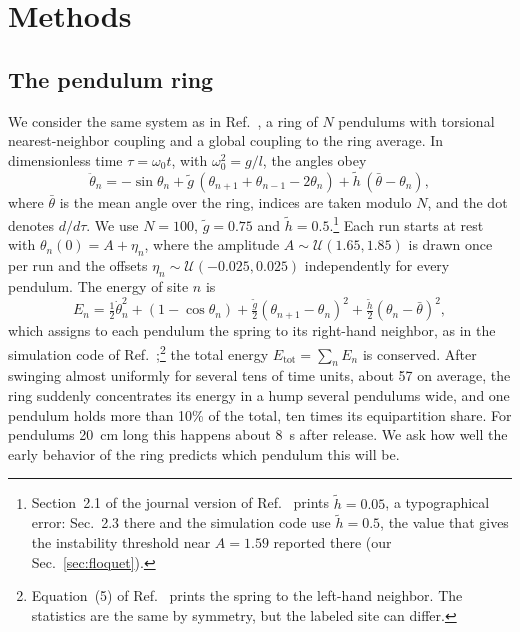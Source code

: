 \documentclass[11pt]{article}
\newcommand{\gt}{\tilde g}
\newcommand{\htl}{\tilde h}
\newcommand{\Etot}{E_{\mathrm{tot}}}
\begin{document}
\section{Methods}
\label{sec:methods}

\subsection{The pendulum ring}

We consider the same system as in Ref.~\cite{mittal2026jand}, a ring of $N$ pendulums with torsional nearest-neighbor coupling and a global coupling to the ring average. In dimensionless time $\tau=\omega_0 t$, with $\omega_0^2=g/l$, the angles obey
\begin{equation}
\label{eq:eom}
\ddot\theta_n = -\sin\theta_n + \gt\,(\theta_{n+1}+\theta_{n-1}-2\theta_n) + \htl\,(\bar\theta-\theta_n),
\end{equation}
where $\bar\theta$ is the mean angle over the ring, indices are taken modulo $N$, and the dot denotes $d/d\tau$. We use $N=100$, $\gt=0.75$ and $\htl=0.5$.\footnote{Section~2.1 of the journal version of Ref.~\cite{mittal2026jand} prints $\htl=0.05$, a typographical error: Sec.~2.3 there and the simulation code use $\htl=0.5$, the value that gives the instability threshold near $A=1.59$ reported there (our Sec.~\ref{sec:floquet}).} Each run starts at rest with $\theta_n(0)=A+\eta_n$, where the amplitude $A\sim\mathcal{U}(1.65,1.85)$ is drawn once per run and the offsets $\eta_n\sim\mathcal{U}(-0.025,0.025)$ independently for every pendulum. The energy of site $n$ is
\begin{equation}
\label{eq:energy}
E_n = \tfrac12\dot\theta_n^2 + (1-\cos\theta_n) + \tfrac{\gt}{2}(\theta_{n+1}-\theta_n)^2 + \tfrac{\htl}{2}(\theta_n-\bar\theta)^2 ,
\end{equation}
which assigns to each pendulum the spring to its right-hand neighbor, as in the simulation code of Ref.~\cite{mittal2026jand};\footnote{Equation~(5) of Ref.~\cite{mittal2026jand} prints the spring to the left-hand neighbor. The statistics are the same by symmetry, but the labeled site can differ.} the total energy $\Etot=\sum_n E_n$ is conserved. After swinging almost uniformly for several tens of time units, about 57 on average, the ring suddenly concentrates its energy in a hump several pendulums wide, and one pendulum holds more than 10\% of the total, ten times its equipartition share. For pendulums 20~cm long this happens about 8~s after release. We ask how well the early behavior of the ring predicts which pendulum this will be.
\end{document}
